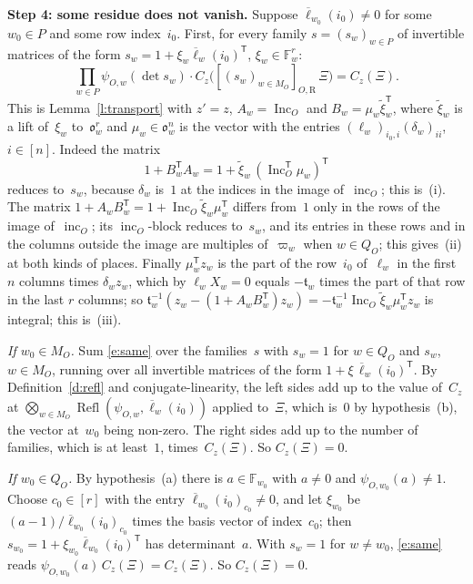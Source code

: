 \documentclass[11pt,a4paper]{article}
\newcommand{\m}[1]{\mbox{$#1$}}        %
\newcommand{\subhead}[1]{\par\addvspace{9pt plus 2pt}\Needspace{4\baselineskip}\noindent\textbf{#1}\enspace\ignorespaces}
\theoremstyle{plainx}
\theoremstyle{uprightx}
\newcommand{\FF}{\mathbb{F}}
\newcommand{\oo}{\mathfrak{o}}
\newcommand{\incO}[1]{\operatorname{inc}_{#1}}
\newcommand{\IncM}[1]{\operatorname{Inc}_{#1}}
\newcommand{\psiO}[2]{\psi_{#1,#2}}
\newcommand{\MO}[1]{M_{#1}}
\newcommand{\QO}[1]{Q_{#1}}
\newcommand{\chact}[3]{[#3]_{#1,#2}}
\newcommand{\Refl}[2]{\operatorname{Refl}(#1,#2)}
\newcommand{\conj}[1]{\overline{#1}}
\begin{document}
\subhead{Step 4: some residue does not vanish.} Suppose \m{\conj{\ell}_{w_{0}}(i_{0})\ne0} for some \m{w_{0}\in P} and
some row index~$i_{0}$. First, for every family \m{s=(s_{w})_{w\in P}} of invertible matrices of the form
\m{s_{w}=1+\xi_{w}\conj{\ell}_{w}(i_{0})^{\mathsf{T}}}, \m{\xi_{w}\in\FF_{w}^{r}}:
\begin{equation}\label{e:same}
\prod_{w\in P}\psiO{O}{w}(\det s_{w})\cdot C_{z}\bigl(\chact{O}{\mathrm{R}}{(s_{w})_{w\in\MO{O}}}\,\Xi\bigr)=C_{z}(\Xi).
\end{equation}
This is Lemma~\ref{l:transport} with \m{z'=z}, \m{A_{w}=\IncM{O}} and \m{B_{w}=\mu_{w}\tilde{\xi}_{w}^{\mathsf{T}}}, where
\m{\tilde{\xi}_{w}} is a lift of~$\xi_{w}$ to~$\oo_{w}^{r}$ and \m{\mu_{w}\in\oo_{w}^{n}} is the vector with the entries
\m{(\ell_{w})_{i_{0},i}(\delta_{w})_{ii}}, \m{i\in[n]}. Indeed the matrix
\[
1+B_{w}^{\mathsf{T}}A_{w}=1+\tilde{\xi}_{w}\,(\IncM{O}^{\mathsf{T}}\mu_{w})^{\mathsf{T}}
\]
reduces to~$s_{w}$, because $\delta_{w}$ is~$1$ at the indices in the image of~$\incO{O}$; this is~(i). The matrix
\m{1+A_{w}B_{w}^{\mathsf{T}}=1+\IncM{O}\tilde{\xi}_{w}\mu_{w}^{\mathsf{T}}} differs from~$1$ only in the rows of the
image of~$\incO{O}$; its $\incO{O}$-block reduces to~$s_{w}$, and its entries in these rows and in the columns
outside the image are multiples of~$\varpi_{w}$ when \m{w\in\QO{O}}; this gives~(ii) at both kinds of places.
Finally \m{\mu_{w}^{\mathsf{T}}z_{w}} is the part of the row~$i_{0}$ of~$\ell_{w}$ in the first $n$ columns times
\m{\delta_{w}z_{w}}, which by \m{\ell_{w}X_{w}=0} equals \m{-\mathfrak{t}_{w}} times the part of that row in the last
$r$ columns; so \m{\mathfrak{t}_{w}^{-1}(z_{w}-(1+A_{w}B_{w}^{\mathsf{T}})z_{w})=-\mathfrak{t}_{w}^{-1}\IncM{O}\tilde{\xi}_{w}\mu_{w}^{\mathsf{T}}z_{w}}
is integral; this is~(iii).

\emph{If \m{w_{0}\in\MO{O}}.} Sum \eqref{e:same} over the families~$s$ with \m{s_{w}=1} for \m{w\in\QO{O}} and $s_{w}$,
\m{w\in\MO{O}}, running over all invertible matrices of the form \m{1+\xi\,\conj{\ell}_{w}(i_{0})^{\mathsf{T}}}. By
Definition~\ref{d:refl} and conjugate-linearity, the left sides add up to the value of~$C_{z}$ at
\m{\bigotimes_{w\in\MO{O}}\Refl{\psiO{O}{w}}{\conj{\ell}_{w}(i_{0})}} applied to~$\Xi$, which is~$0$ by hypothesis~(b), the vector
at~$w_{0}$ being non-zero. The right sides add up to the number of families, which is at least~$1$,
times~$C_{z}(\Xi)$. So \m{C_{z}(\Xi)=0}.

\emph{If \m{w_{0}\in\QO{O}}.} By hypothesis~(a) there is \m{a\in\FF_{w_{0}}} with \m{a\ne0} and
\m{\psiO{O}{w_{0}}(a)\ne1}. Choose \m{c_{0}\in[r]} with the entry \m{\conj{\ell}_{w_{0}}(i_{0})_{c_{0}}\ne0}, and let
\m{\xi_{w_{0}}} be \m{(a-1)/\conj{\ell}_{w_{0}}(i_{0})_{c_{0}}} times the basis vector of index~$c_{0}$; then
\m{s_{w_{0}}=1+\xi_{w_{0}}\conj{\ell}_{w_{0}}(i_{0})^{\mathsf{T}}} has determinant~$a$. With \m{s_{w}=1} for \m{w\ne w_{0}},
\eqref{e:same} reads \m{\psiO{O}{w_{0}}(a)\,C_{z}(\Xi)=C_{z}(\Xi)}. So \m{C_{z}(\Xi)=0}.
\end{document}
